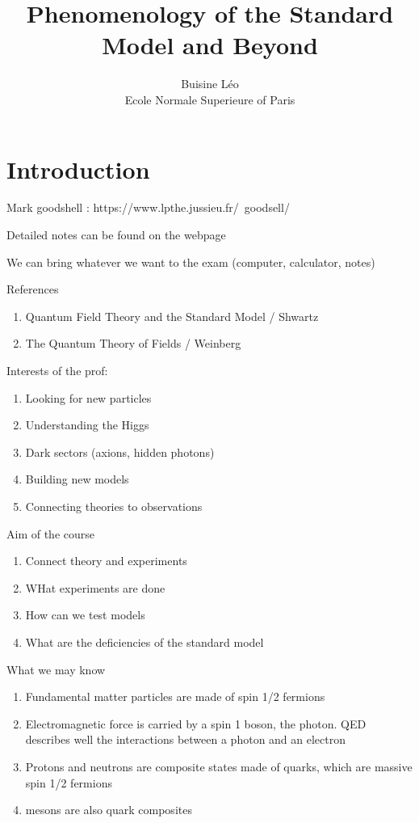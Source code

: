 \documentclass[a4paper]{book}
\theoremstyle{definition}
\theoremstyle{remark}
\begin{document}
\title{Phenomenology of the Standard Model and Beyond}
\author{Buisine Léo\\Ecole Normale Superieure of Paris}
\maketitle

\tableofcontents

\chapter{Introduction}
Mark goodshell : https://www.lpthe.jussieu.fr/~goodsell/ \par 
Detailed notes can be found on the webpage 
\par \medskip 

We can bring whatever we want to the exam (computer, calculator, notes)\par \medskip 

References 
\begin{enumerate}
    \item Quantum Field Theory and the Standard Model / Shwartz 
    \item The Quantum Theory of Fields / Weinberg
\end{enumerate}

Interests of the prof: 
\begin{enumerate}
    \item Looking for new particles
    \item Understanding the Higgs
    \item Dark sectors (axions, hidden photons)
    \item Building new models
    \item Connecting theories to observations
\end{enumerate}

Aim of the course
\begin{enumerate}
    \item Connect theory and experiments
    \item WHat experiments are done 
    \item How can we test models 
    \item What are the deficiencies of the standard model 
\end{enumerate}

What we may know 
\begin{enumerate}
    \item Fundamental matter particles are made of spin 1/2 fermions 
    \item Electromagnetic force is carried by a spin 1 boson, the photon. QED describes well the interactions between a photon and an electron 
    \item Protons and neutrons are composite states made of quarks, which are massive spin 1/2 fermions 
    \item mesons are also quark composites
\end{enumerate}
\end{document}
